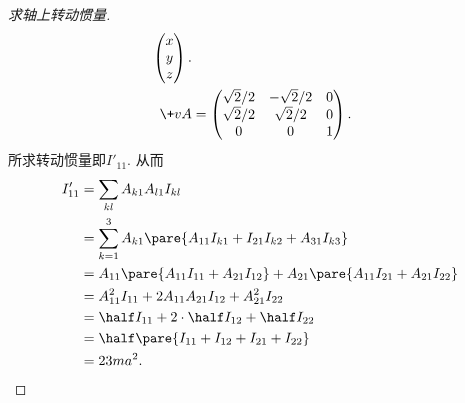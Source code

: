 \documentclass[../LectureNotes.tex]{subfiles}
\begin{document}
\begin{sample}
\begin{proof}[求轴上转动惯量]
\begin{align*}
\begin{pmatrix}
            x \\ y \\ z
        \end{pmatrix}. \\
        \+vA &= \begin{pmatrix}
            \sqrt{2}/2 & -\sqrt{2}/2 & 0 \\
            \sqrt{2}/2 & \sqrt{2}/2 & 0 \\
            0 & 0 & 1
        \end{pmatrix}.
        \end{align*}
        所求转动惯量即$I'_{11}$. 从而
        \begin{align*}
            I'_{11} &= \sum_{kl} A_{k1}A_{l1} I_{kl} \\
            &= \sum_{k=1}^3 A_{k1}\pare{A_{11}I_{k1} + I_{21}I_{k2} + A_{31}I_{k3}} \\
            &= A_{11}\pare{A_{11} I_{11} + A_{21}I_{12}} + A_{21}\pare{A_{11}I_{21} + A_{21}I_{22}} \\
            &= A_{11}^2 I_{11} + 2A_{11}A_{21}I_{12} + A_{21}^2I_{22} \\
            &= \half I_{11} + 2\cdot \half I_{12} + \half I_{22} \\
            &= \half \pare{I_{11} + I_{12} + I_{21} + I_{22}} \\
            &= 23ma^2. \qedhere
        \end{align*}
    \end{proof}
\end{sample}
\end{document}
